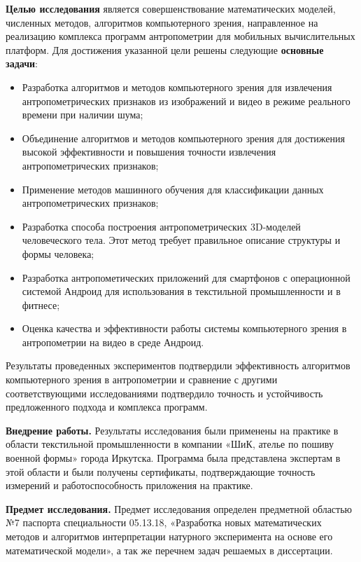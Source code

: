 \textbf{Целью исследования} является совершенствование математических моделей, численных методов, алгоритмов компьютерного зрения, направленное на реализацию комплекса программ антропометрии для мобильных вычислительных платформ.  Для достижения указанной цели решены следующие \textbf {основные задачи}:
\begin{itemize}
	\item Разработка алгоритмов и методов компьютерного зрения для извлечения антропометрических признаков из изображений и видео в режиме реального времени при наличии шума;
	\item Объединение алгоритмов и методов компьютерного зрения для достижения высокой эффективности и повышения точности извлечения антропометрических признаков;
	\item Применение методов машинного обучения для классификации данных антропометрических признаков;
	\item Разработка способа построения антропометрических 3D-моделей человеческого тела. Этот метод требует правильное описание структуры и формы человека;
	\item Разработка антропометических приложений для смартфонов с операционной системой Андроид для использования в текстильной промышленности и в фитнесе;
	\item Оценка качества и эффективности работы системы компьютерного зрения в антропометрии на видео в среде Андроид.
\end{itemize}
Результаты проведенных экспериментов подтвердили эффективность алгоритмов компьютерного зрения в антропометрии и сравнение с другими соответствующими исследованиями подтвердило точность и устойчивость предложенного подхода и комплекса программ.

\textbf{Внедрение работы.} Результаты исследования были применены на практике в области текстильной промышленности в компании «ШиК, ателье по пошиву военной формы» города Иркутска. Программа была представлена экспертам в этой области и были получены сертификаты, подтверждающие точность измерений и работоспособность приложения на практике.

\textbf{Предмет исследования.} Предмет исследования определен предметной областью №7 паспорта специальности 05.13.18, «Разработка новых математических методов и алгоритмов интерпретации натурного эксперимента на основе его математической модели», а так же перечнем задач решаемых в диссертации.

